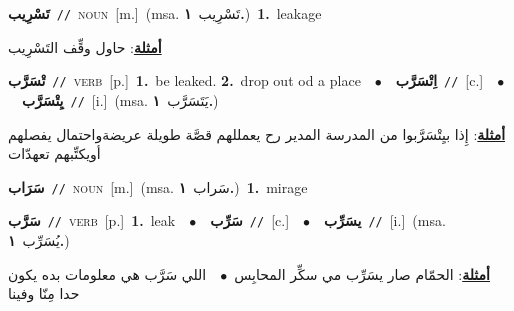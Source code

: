 \documentclass[10pt,a4paper,twoside]{article} %
\begin{document}
\begin{multicols}{2}
{\setlength\topsep{0pt}\textbf{\foreignlanguage{arabic}{تَسْرِيب}}\ {\color{gray}\texttt{//}\color{black}}\ \textsc{noun}\ [m.]\ \color{gray}(msa. \foreignlanguage{arabic}{تَسْرِيب}~\foreignlanguage{arabic}{\textbf{١.}})\color{black}\ \textbf{1.}~leakage\  \begin{flushright}\color{gray}\foreignlanguage{arabic}{\textbf{\underline{\foreignlanguage{arabic}{أمثلة}}}: حاول وقِّف التَسْرِيب}\end{flushright}\color{black}} \vspace{2mm}

{\setlength\topsep{0pt}\textbf{\foreignlanguage{arabic}{تْسَرَّب}}\ {\color{gray}\texttt{//}\color{black}}\ \textsc{verb}\ [p.]\ \textbf{1.}~be leaked.  \textbf{2.}~drop out od a place\ \ $\bullet$\ \ \setlength\topsep{0pt}\textbf{\foreignlanguage{arabic}{اِتْسَرَّب}}\ {\color{gray}\texttt{//}\color{black}}\ [c.]\ \ $\bullet$\ \ \setlength\topsep{0pt}\textbf{\foreignlanguage{arabic}{يِتْسَرَّب}}\ {\color{gray}\texttt{//}\color{black}}\ [i.]\ \color{gray}(msa. \foreignlanguage{arabic}{يَتَسَرَّب}~\foreignlanguage{arabic}{\textbf{١.}})\color{black}\  \begin{flushright}\color{gray}\foreignlanguage{arabic}{\textbf{\underline{\foreignlanguage{arabic}{أمثلة}}}: إِذا بيِتْسَرَّبوا من المدرسة المدير رح يعمللهم قصَّة طويلة عريضةواحتمال يفصلهم أويكتِّبهم تعهدّات}\end{flushright}\color{black}} \vspace{2mm}

{\setlength\topsep{0pt}\textbf{\foreignlanguage{arabic}{سَرَاب}}\ {\color{gray}\texttt{//}\color{black}}\ \textsc{noun}\ [m.]\ \color{gray}(msa. \foreignlanguage{arabic}{سَراب}~\foreignlanguage{arabic}{\textbf{١.}})\color{black}\ \textbf{1.}~mirage\ } \vspace{2mm}

{\setlength\topsep{0pt}\textbf{\foreignlanguage{arabic}{سَرَّب}}\ {\color{gray}\texttt{//}\color{black}}\ \textsc{verb}\ [p.]\ \textbf{1.}~leak\ \ $\bullet$\ \ \setlength\topsep{0pt}\textbf{\foreignlanguage{arabic}{سَرِّب}}\ {\color{gray}\texttt{//}\color{black}}\ [c.]\ \ $\bullet$\ \ \setlength\topsep{0pt}\textbf{\foreignlanguage{arabic}{يسَرِّب}}\ {\color{gray}\texttt{//}\color{black}}\ [i.]\ \color{gray}(msa. \foreignlanguage{arabic}{يُسَرِّب}~\foreignlanguage{arabic}{\textbf{١.}})\color{black}\  \begin{flushright}\color{gray}\foreignlanguage{arabic}{\textbf{\underline{\foreignlanguage{arabic}{أمثلة}}}: الحمّام صار يسَرِّب مي سكِّر المحابِس\ $\bullet$\ \  اللي سَرَّب هي معلومات بده يكون حدا مِنّا وفينا}\end{flushright}\color{black}} \vspace{2mm}


\end{multicols}
\end{document}
